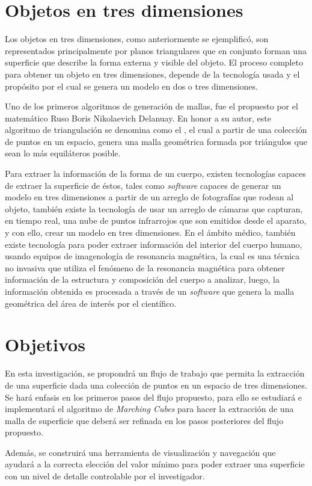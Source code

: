 \section{Objetos en tres dimensiones}
\label{sec:objectosEnTresDimensiones}
Los objetos en tres dimensiones, como anteriormente se ejemplificó, son representados
principalmente por planos triangulares que en conjunto forman una superficie que describe la
forma externa y visible del objeto. El proceso completo para obtener un objeto en tres dimensiones, depende de la tecnología usada y el propósito por el cual se genera un modelo en
dos o tres dimensiones.

Uno de los primeros algoritmos de generación de mallas, fue el propuesto por el
matemático Ruso Boris Nikolaevich Delanuay. En honor a su autor, este algoritmo de
triangulación se denomina como el , el cual a partir de
una colección de puntos en un espacio, genera una malla geométrica formada por triángulos que
sean lo más equiláteros posible.

Para extraer la información de la forma de un cuerpo, existen tecnologías capaces de
extraer la superficie de éstos, tales como \emph{software} capaces de generar un modelo en tres
dimensiones a partir de un arreglo de fotografías que rodean al objeto, también existe la
tecnología de usar un arreglo de cámaras que capturan, en tiempo real, una nube de puntos
infrarrojos que son emitidos desde el aparato, y con ello, crear un modelo en tres dimensiones. En
el ámbito médico, también existe tecnología para poder extraer información del interior del
cuerpo humano, usando equipos de imagenología de resonancia magnética, la cual es una técnica
no invasiva que utiliza el fenómeno de la resonancia magnética para obtener información de la
estructura y composición del cuerpo a analizar, luego, la información obtenida es procesada a
través de un \emph{software} que genera la malla geométrica del área de interés por el científico.

\section{Objetivos}
\label{sec:objetivos}
En esta investigación, se propondrá un flujo de trabajo que permita la extracción de una superficie dada una colección de puntos en un espacio de tres dimensiones. Se hará enfasis en los primeros pasos del flujo propuesto, para ello se estudiará e implementará el algoritmo de \emph{Marching Cubes} para hacer la extracción de una malla de superficie que deberá ser refinada en los pasos posteriores del flujo propuesto.

Además, se construirá una herramienta de visualización y navegación que ayudará a la correcta elección del valor mínimo para poder extraer una superficie con un nivel de detalle controlable por el investigador.